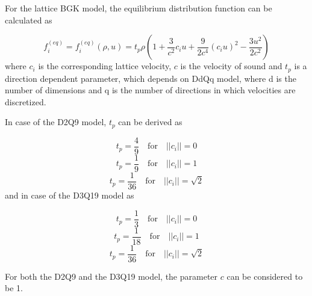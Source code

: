For the lattice BGK model, the equilibrium distribution function can be calculated as

\begin{equation}
f_i^{(eq)} = f_i^{(eq)}(\rho, u) = t_p \rho ( 1 + \frac{3}{c^2} c_i u + \frac{9}{2c^4} (c_i u)^2 - \frac{3u^2}{2c^2})
\end{equation}
where $c_i$ is the corresponding lattice velocity, $c$ is the velocity of sound and $t_p$ is a direction dependent parameter, which depends on DdQq model, where d is the number of dimensions and q is the number of directions in which velocities are discretized.

In case of the D2Q9 model, $t_p$ can be derived as

\begin{equation}
t_p = \frac{4}{9} \quad \textrm{for} \quad ||c_i||=0
\end{equation}
\begin{equation}
t_p = \frac{1}{9} \quad \textrm{for} \quad ||c_i||=1
\end{equation}
\begin{equation}
t_p = \frac{1}{36} \quad \textrm{for} \quad ||c_i||=\sqrt{2}
\end{equation}
and in case of the D3Q19 model as

\begin{equation}
t_p = \frac{1}{3} \quad \textrm{for} \quad ||c_i||=0
\end{equation}
\begin{equation}
t_p = \frac{1}{18} \quad \textrm{for} \quad ||c_i||=1
\end{equation}
\begin{equation}
t_p = \frac{1}{36} \quad \textrm{for} \quad ||c_i||=\sqrt{2}
\end{equation}

For both the D2Q9 and the D3Q19 model, the parameter $c$ can be considered to be 1.